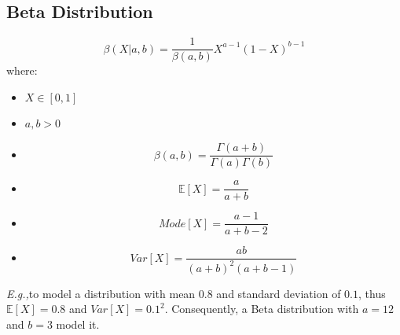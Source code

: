 \documentclass{article}
\newcommand{\Eg}{\textit{E.g.,}}
\begin{document}
\subsection{Beta Distribution}
\begin{equation}
    \beta(X|a, b) = \frac{1}{\beta(a, b)}X^{a-1}(1 - X)^{b - 1}
\end{equation}
where:\begin{itemize}
    \item $X \in [0, 1]$
    \item $a, b > 0$
    \item \begin{equation}
        \beta(a, b) = \frac{\Gamma(a+b)}{\Gamma(a)\Gamma(b)}
    \end{equation}
    \item \begin{equation}
        \mathbb{E}[X] = \frac{a}{a+b}
    \end{equation}
    \item \begin{equation}
        Mode[X] = \frac{a-1}{a+b-2}
    \end{equation}
    \item \begin{equation}
        Var[X] = \frac{ab}{(a+b)^2(a+b-1)}
    \end{equation}
\end{itemize} 
\Eg to model a distribution with mean $0.8$ and standard deviation of $0.1$, thus $\mathbb{E}[X] = 0.8$ and $Var[X] = 0.1^2$. Consequently, a Beta distribution with $a = 12$ and $b = 3$ model it.
\end{document}
